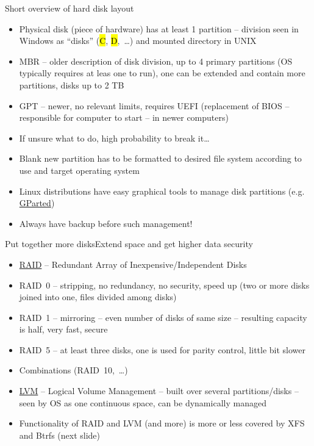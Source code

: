 \documentclass[compress, ucs, xelatex, 11pt, xcolor=svgnames,
  hyperref={
    bookmarks=true,
    unicode=true,
    colorlinks=true,
    pdftitle={Linux, command line and MetaCentrum},
    plainpages=false,
    pdfauthor={Vojtech Zeisek},
    pdfsubject={Course about use of Linux command line, writing shell scripts and using MetaCentrum of CESNET},
    pdfcreator={XeLaTeX},
    pdfkeywords={Linux, GNU, BASH, shell, command line, MetaCentrum},
    linkcolor=DarkRed,
    anchorcolor=DarkBlue,
    citecolor=Indigo,
    filecolor=NavyBlue,
    menucolor=DarkMagenta,
    urlcolor=DarkBlue,
    pdftex},
  url={hyphens, lowtilde} %
  ]{beamer}
\renewcommand{\texttt}[1]{\hl{\ttfamily #1}}
\begin{document}
\begin{frame}{Short overview of hard disk layout}
  \begin{itemize}
    \item Physical disk (piece of hardware) has at least 1 partition -- division seen in Windows as ``disks'' (\texttt{C}, \texttt{D},~\ldots) and mounted directory in UNIX
    \item MBR -- older description of disk division, up to 4 primary partitions (OS typically requires at leas one to run), one can be extended and contain more partitions, disks up to 2 TB
    \item GPT -- newer, no relevant limits, requires UEFI (replacement of BIOS -- responsible for computer to start -- in newer computers)
    \item If unsure what to do, high probability to break it\ldots
    \item Blank new partition has to be formatted to desired file system according to use and target operating system
    \item Linux distributions have easy graphical tools to manage disk partitions (e.g. \href{http://gparted.org/}{GParted})
    \item Always have backup before such management!
  \end{itemize}
\end{frame}

\begin{frame}{Put together more disks}{Extend space and get higher data security}
  \label{LVMRAID}
  \begin{itemize}
    \item \href{https://en.wikipedia.org/wiki/RAID}{RAID} -- Redundant Array of Inexpensive/Independent Disks
    \item RAID~0 -- stripping, no redundancy, no security, speed up (two or more disks joined into one, files divided among disks)
    \item RAID~1 -- mirroring -- even number of disks of same size -- resulting capacity is half, very fast, secure
    \item RAID~5 -- at least three disks, one is used for parity control, little bit slower
    \item Combinations (RAID~10,~\ldots)
    \item \href{https://en.wikipedia.org/wiki/Logical_volume_management}{LVM} -- Logical Volume Management -- built over several partitions/disks -- seen by OS as one continuous space, can be dynamically managed
    \item Functionality of RAID and LVM (and more) is more or less covered by XFS and Btrfs (next slide)
  \end{itemize}
\end{frame}
\end{document}
